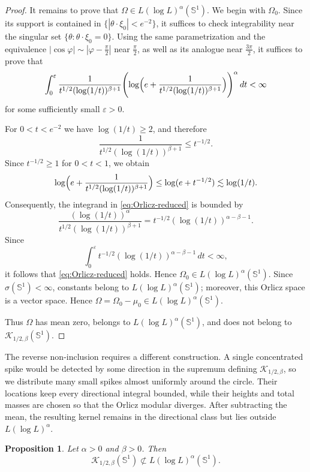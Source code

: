 \documentclass[11pt]{amsart}
\newtheorem{proposition}[definition]{Proposition}
\theoremstyle{remark}
\numberwithin{equation}{section}
\newcommand{\Sph}{\mathbb S^1}
\newcommand{\cK}{\mathcal K}
\begin{document}
\begin{proof}
		It remains to prove that \(\Omega\in L(\log L)^\alpha(\Sph)\).
		We begin with \(\Omega_0\). Since its support is contained in
		\(\{|\theta\cdot\xi_0|<e^{-2}\}\), it suffices to check integrability near the
		singular set \(\{\theta:\theta\cdot\xi_0=0\}\). Using the same parametrization
		and the equivalence \(|\cos\varphi|\sim |\varphi-\frac\pi2|\) near
		\(\frac\pi2\), as well as its analogue near \(\frac{3\pi}{2}\), it suffices to
		prove that
		\begin{equation}\label{eq:Orlicz-reduced}
			\int_0^\varepsilon
			\frac{1}{t^{1/2}(\log(1/t))^{\beta+1}}
			\Biggl(
			\log\Bigl(
			e+\frac{1}{t^{1/2}(\log(1/t))^{\beta+1}}
			\Bigr)
			\Biggr)^\alpha
			\,dt
			<\infty
		\end{equation}
		for some sufficiently small \(\varepsilon>0\).
		
		For \(0<t<e^{-2}\) we have \(\log(1/t)\ge 2\), and therefore
		\[
		\frac{1}{t^{1/2}(\log(1/t))^{\beta+1}}
		\le t^{-1/2}.
		\]
		Since \(t^{-1/2}\ge 1\) for \(0<t<1\), we obtain
		\[
		\log\Bigl(
		e+\frac{1}{t^{1/2}(\log(1/t))^{\beta+1}}
		\Bigr)
		\le
		\log(e+t^{-1/2})
		\lesssim \log(1/t).
		\]
		Consequently, the integrand in \eqref{eq:Orlicz-reduced} is bounded by
		\[
		\frac{(\log(1/t))^\alpha}{t^{1/2}(\log(1/t))^{\beta+1}}
		=
		t^{-1/2}(\log(1/t))^{\alpha-\beta-1}.
		\]
		Since
		\[
		\int_0^\varepsilon t^{-1/2}(\log(1/t))^{\alpha-\beta-1}\,dt<\infty,
		\]
		it follows that \eqref{eq:Orlicz-reduced} holds. Hence
		\(\Omega_0\in L(\log L)^\alpha(\Sph)\). Since \(\sigma(\Sph)<\infty\),
		constants belong to \(L(\log L)^\alpha(\Sph)\); moreover, this Orlicz space is
		a vector space. Hence
		\(\Omega=\Omega_0-\mu_0\in L(\log L)^\alpha(\Sph)\).
		
		Thus \(\Omega\) has mean zero, belongs to
		\(L(\log L)^\alpha(\Sph)\), and does not belong to
		\(\cK_{1/2,\beta}(\Sph)\).
	\end{proof}
	
	The reverse non-inclusion requires a different construction.  A single
	concentrated spike would be detected by some direction in the supremum defining
	\(\cK_{1/2,\beta}\), so we distribute many small spikes almost uniformly around
	the circle.  Their locations keep every directional integral bounded, while
	their heights and total masses are chosen so that the Orlicz modular diverges.
	After subtracting the mean, the resulting kernel remains in the directional
	class but lies outside \(L(\log L)^\alpha\).
	
	\begin{proposition}\label{prop:Klog-not-Orlicz}
		Let \(\alpha>0\) and \(\beta>0\). Then
		\[
		\cK_{1/2,\beta}(\Sph)\not\subset
		L(\log L)^\alpha(\Sph).
		\]
	\end{proposition}
	
\end{document}

